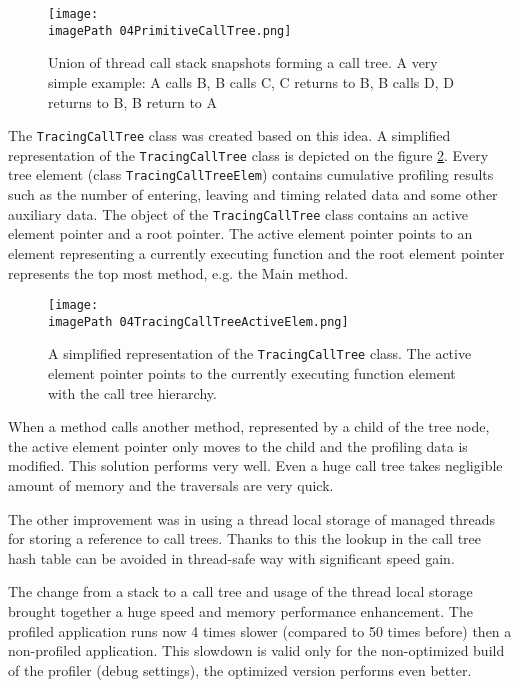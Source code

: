 \begin{figure}
	\centering
		\texttt{[image: \\imagePath 04PrimitiveCallTree.png]}
		\caption{ Union of thread call stack snapshots forming a call tree. A very simple example: A calls  B, B calls C, C returns to B, B calls D, D returns to B, B return to A }
	\label{fig:04PrimitiveCallTree}
\end{figure}

The \texttt{TracingCallTree} class was created based on this idea.
A simplified representation of the \texttt{TracingCallTree} class is depicted on the figure \ref{fig:04TracingCallTreeActiveElem}. Every tree element (class \texttt{TracingCallTreeElem}) contains cumulative profiling results such as the number of entering, leaving and timing related data and some other auxiliary data. The object of the \texttt{TracingCallTree} class contains an active element pointer and a root pointer. The active element pointer points to an element representing a currently executing function and the root element pointer represents the top most method, e.g. the Main method. 


\begin{figure}
	\centering
		\texttt{[image: \\imagePath 04TracingCallTreeActiveElem.png]}
		\caption{A simplified representation of the \texttt{TracingCallTree} class. The active element pointer points to the currently executing function element with the call tree hierarchy. }
	\label{fig:04TracingCallTreeActiveElem}
\end{figure}


When a method calls another method, represented by a child of the tree node, the active element pointer only moves to the child and the profiling data is modified. This solution performs very well. Even a huge call tree takes negligible amount of memory and the traversals are very quick. 

The other improvement was in using a thread local storage of managed threads for storing a reference to call trees. Thanks to this the lookup in the call tree hash table can be avoided in thread-safe way with significant speed gain. 

The change from a stack to a call tree and usage of the thread local storage brought together a huge speed and memory performance enhancement. The profiled application runs now 4 times slower (compared to 50 times before) then a non-profiled application. This slowdown is valid only for the non-optimized build of the profiler (debug settings), the optimized version performs even better. 

